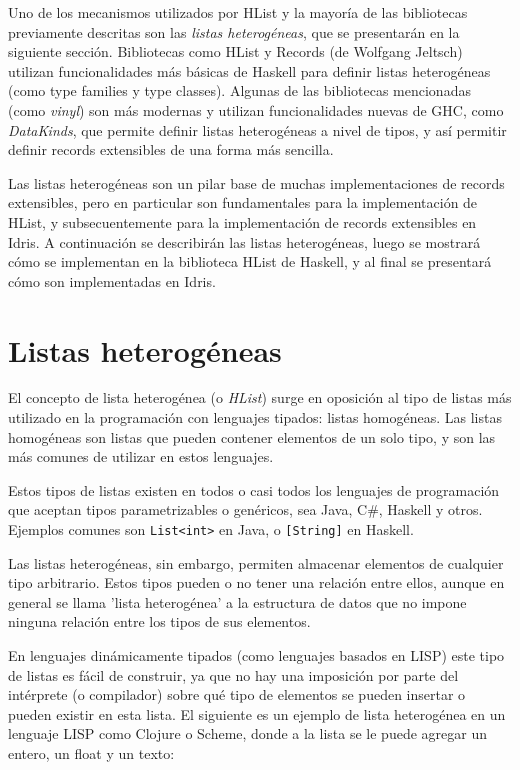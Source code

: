 Uno de los mecanismos utilizados por HList y la mayoría de las bibliotecas previamente descritas son las \textit{listas heterogéneas}, que se presentarán en la siguiente sección. Bibliotecas como HList y Records (de Wolfgang Jeltsch) utilizan funcionalidades más básicas de Haskell para definir listas heterogéneas (como type families y type classes). Algunas de las bibliotecas mencionadas (como \textit{vinyl}) son más modernas y utilizan funcionalidades nuevas de GHC, como \textit{DataKinds}, que permite definir listas heterogéneas a nivel de tipos, y así permitir definir records extensibles de una forma más sencilla.

Las listas heterogéneas son un pilar base de muchas implementaciones de records extensibles, pero en particular son fundamentales para la implementación de HList, y subsecuentemente para la implementación de records extensibles en Idris. A continuación se describirán las listas heterogéneas, luego se mostrará cómo se implementan en la biblioteca HList de Haskell, y al final se presentará cómo son implementadas en Idris.

\section{Listas heterogéneas}

El concepto de lista heterogénea (o \textit{HList}) surge en oposición al tipo de listas más utilizado en la programación con lenguajes tipados: listas homogéneas. Las listas homogéneas son listas que pueden contener elementos de un solo tipo, y son las más comunes de utilizar en estos lenguajes.

Estos tipos de listas existen en todos o casi todos los lenguajes de programación que aceptan tipos parametrizables o genéricos, sea Java, C\#, Haskell y otros. Ejemplos comunes son \texttt{List<int>} en Java, o \texttt{[String]} en Haskell.

Las listas heterogéneas, sin embargo, permiten almacenar elementos de cualquier tipo arbitrario. Estos tipos pueden o no tener una relación entre ellos, aunque en general se llama 'lista heterogénea' a la estructura de datos que no impone ninguna relación entre los tipos de sus elementos.

En lenguajes dinámicamente tipados (como lenguajes basados en LISP) este tipo de listas es fácil de construir, ya que no hay una imposición por parte del intérprete (o compilador) sobre qué tipo de elementos se pueden insertar o pueden existir en esta lista. El siguiente es un ejemplo de lista heterogénea en un lenguaje LISP como Clojure o Scheme, donde a la lista se le puede agregar un entero, un float y un texto:

